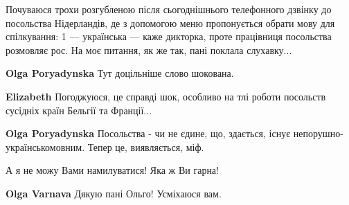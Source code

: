 \begin{itemize}
Почуваюся трохи розгубленою після сьогоднішнього телефонного дзвінку до
посольства Нідерландів, де з допомогою меню пропонується обрати мову для
спілкування: 1 — українська — каже дикторка, проте працівниця посольства
розмовляє рос. На моє питання, як же так, пані поклала слухавку...

\begin{itemize}
 
\textbf{Olga Poryadynska} Тут доцільніше слово шокована. \Smiley[1.0][yellow]

 
\textbf{Elizabeth} Погоджуюся, це справді шок, особливо на тлі роботи посольств сусідніх країн Бельгії та Франції...

 
\textbf{Olga Poryadynska} Посольства - чи не єдине, що, здається, існує непорушно-українськомовним. Тепер це, виявляється, міф. 🙁
\end{itemize}

 
А я не можу Вами намилуватися! Яка ж Ви гарна!

\begin{itemize}
 
\textbf{Olga Varnava} Дякую пані Ольго! Усміхаюся вам. \Smiley[1.0][yellow]
\end{itemize}


\end{itemize}
